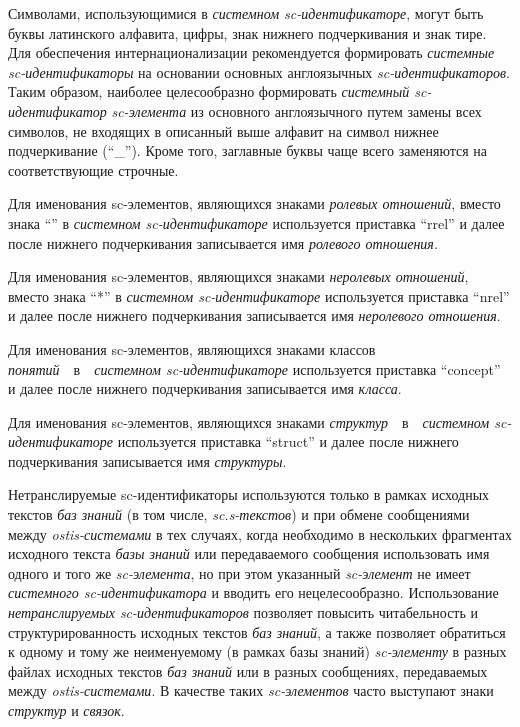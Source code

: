 Символами, использующимися в \textit{системном sc-идентификаторе}, могут быть буквы латинского алфавита, цифры, знак нижнего подчеркивания и знак тире. Для обеспечения интернационализации рекомендуется формировать \textit{системные sc-идентификаторы} на основании основных англоязычных \textit{sc-идентификаторов}. Таким образом, наиболее целесообразно формировать \textit{системный sc-идентификатор} \textit{sc-элемента} из основного англоязычного путем замены всех символов, не входящих в описанный выше алфавит на символ нижнее подчеркивание (``\_''). Кроме того, заглавные буквы чаще всего заменяются на соответствующие строчные.

Для именования sc-элементов, являющихся знаками \textit{ролевых отношений}, вместо знака ``\scnrolesign'' в \textit{системном sc-идентификаторе} используется приставка ``rrel'' и далее после нижнего подчеркивания записывается имя \textit{ролевого отношения}.

Для именования sc-элементов, являющихся знаками \textit{неролевых отношений}, вместо знака ``*'' в \textit{системном sc-идентификаторе} используется приставка ``nrel'' и далее после нижнего подчеркивания записывается имя \textit{неролевого отношения}.

Для именования sc-элементов, являющихся знаками классов \textit{понятий}~~в~~\textit{системном sc-идентификаторе} используется приставка ``concept'' и далее после нижнего подчеркивания записывается имя \textit{класса}.

Для именования sc-элементов, являющихся знаками \textit{структур}~~в~~\textit{системном sc-идентификаторе} используется приставка ``struct'' и далее после нижнего подчеркивания записывается имя \textit{структуры}.


\begin{SCn}
\end{SCn}

Нетранслируемые sc-идентификаторы используются только в рамках исходных текстов \textit{баз знаний} (в том числе, \textit{sc.s-текстов}) и при обмене сообщениями между \textit{ostis-системами} в тех случаях, когда необходимо в нескольких фрагментах исходного текста \textit{базы знаний} или передаваемого сообщения использовать имя одного и того же \textit{sc-элемента}, но при этом указанный \textit{sc-элемент} не имеет \textit{системного sc-идентификатора} и вводить его нецелесообразно. Использование \textit{нетранслируемых sc-идентификаторов} позволяет повысить читабельность и структурированность исходных текстов \textit{баз знаний}, а также позволяет обратиться к одному и тому же неименуемому (в рамках базы знаний) \textit{sc-элементу} в разных файлах исходных текстов \textit{баз знаний} или в разных сообщениях, передаваемых между \textit{ostis-системами}. В качестве таких \textit{sc-элементов} часто выступают знаки \textit{структур} и \textit{связок}.

